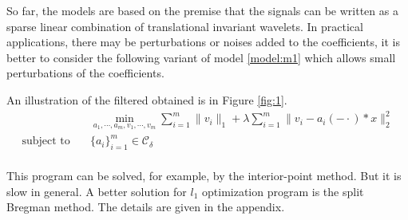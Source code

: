 \documentclass[a4paper]{article}
\begin{document}



So far, the models are based on the premise that the signals can be written as a sparse linear combination of translational invariant wavelets. In practical applications, there may be perturbations or noises added to the coefficients, it is better to consider the following variant of model \eqref{model:m1} which allows small perturbations of the coefficients.

An illustration of the filtered obtained is in Figure \ref{fig:1}.
\begin{equation}
\label{model:m3}
\begin{aligned}
	&\min_{a_1,\cdots,a_m,v_1,\cdots,v_m} \sum_{i=1}^m \|v_i\|_1  + \lambda \sum_{i=1}^m \|v_i - a_i(-\cdot)*x\|_2^2\\
	\textrm{subject to} \quad& \{a_i\}_{i=1}^m \in \mathcal{C_\delta} \\		 
\end{aligned}
\end{equation}

This program can be solved, for example, by the interior-point method. But it is slow in general. A better solution for $l_1$ optimization program is the split Bregman method\cite{goldstein2009split}. The details are given in the appendix.
\end{document}
